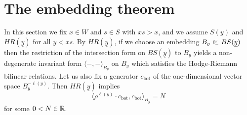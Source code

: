 \documentclass[11pt]{amsart}
\numberwithin{equation}{section}
\def\a{\alpha}
\def\b{\beta}
\def\z{\zeta}
\def\bot{{\mathrm{bot}}}
\def\ov{\overline}
\def\un{\underline}
\def\summand{
\mathbin{\tikz [baseline=-3pt]
{
\clip (-0.2,-0.15) rectangle (0.2,0.15);
\node[scale=1.2] at (0,0) {$\subset$}; \node[scale=0.5] at
  (0,0) {$\oplus$}; }}
}
\theoremstyle{definition}
\theoremstyle{remark}
\begin{document}



\section{The embedding theorem} \label{sec:embedding}

In this section we fix $x \in W$ and $s \in S$ with $xs > x$,
and we assume $S(y)$ and $HR(\un{y})$ for all $y < xs$. By
$HR(\un{y})$, if we choose an embedding $B_y \summand BS(\un{y})$ then
the restriction of the intersection form on $BS(\un{y})$ to $B_y$
yields a non-degenerate invariant form $\langle -,- \rangle_{B_y}$ on
$B_y$ which satisfies the Hodge-Riemann bilinear relations. 
Let us also fix a generator $c_\bot$ of the one-dimensional vector space
$B_y^{-\ell(y)}$. Then $HR(\un{y})$ implies 
\begin{equation} \label{eq:ynorm} \langle \rho^{\ell(y)} \cdot c_\bot, c_\bot \rangle_{B_y} = N
\end{equation} for some $0 < N \in {\mathbb{R}}$.
\end{document}
